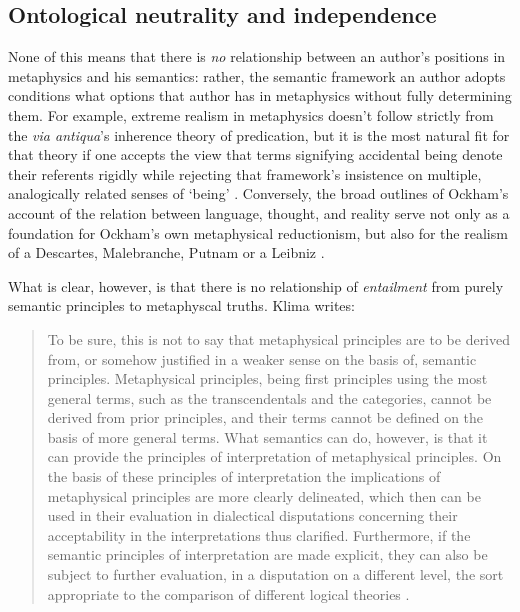 \documentclass[]{article}
\begin{document}
\subsection{Ontological neutrality and independence}
None of this means that there is \emph{no} relationship between an author's positions in metaphysics and his semantics: 
rather, 
the semantic framework an author adopts conditions what options that author has in metaphysics without fully determining them. 
For example, extreme realism in metaphysics doesn't follow strictly from the \emph{via antiqua}'s inherence theory of predication, 
but it is the most natural fit for that theory 
if one accepts the view that terms signifying accidental being denote their referents rigidly 
while rejecting that framework's insistence on multiple, analogically related senses of `being' \autocite[125]{Klima1999}. 
Conversely, the broad outlines of Ockham's account of the relation between language, thought, and reality 
serve not only as a foundation for Ockham's own metaphysical reductionism, 
but also for the realism of a Descartes, Malebranche, Putnam or a Leibniz \autocite{Klima1991}. 

What is clear, however, is that there is no relationship of \emph{entailment} from purely semantic principles to metaphyscal truths. Klima writes: 
\begin{quote}
To be sure, this is not to say that metaphysical principles are to be derived from, or somehow justified 
in a weaker sense on the basis of, semantic principles. Metaphysical principles, being first principles 
using the most general terms, such as the transcendentals and the categories, cannot be derived from 
prior principles, and their terms cannot be defined on the basis of more general terms. What 
semantics can do, however, is that it can provide the principles of interpretation of metaphysical 
principles. On the basis of these principles of interpretation the implications of metaphysical 
principles are more clearly delineated, which then can be used in their evaluation in dialectical 
disputations concerning their acceptability in the interpretations thus clarified. Furthermore, if the 
semantic principles of interpretation are made explicit, they can also be subject to further evaluation, 
in a disputation on a different level, the sort appropriate to the comparison of different logical 
theories  \autocite[49]{Klima2011b}.
\end{quote}
\end{document}
